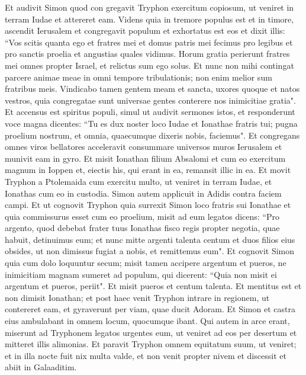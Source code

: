 \begin{biblechapter}  
\verse Et audivit Simon quod con gregavit Tryphon exercitum copiosum, ut veniret in terram Iudae et attereret eam. 
\verse Videns quia in tremore populus est et in timore, ascendit Ierusalem et congregavit populum 
\verse et exhortatus est eos et dixit illis: “Vos scitis quanta ego et fratres mei et domus patris mei fecimus pro legibus et pro sanctis proelia et angustias quales vidimus. 
\verse Horum gratia perierunt fratres mei omnes propter Israel, et relictus sum ego solus.  
\verse Et nunc non mihi contingat parcere animae meae in omni tempore tribulationis; non enim melior sum fratribus meis. 
\verse Vindicabo tamen gentem meam et sancta, uxores quoque et natos vestros, quia congregatae sunt universae gentes conterere nos inimicitiae gratia". 
\verse Et accensus est spiritus populi, simul ut audivit sermones istos, 
\verse et responderunt voce magna dicentes: “Tu es dux noster loco Iudae et Ionathae fratris tui; 
\verse pugna proelium nostrum, et omnia, quaecumque dixeris nobis, faciemus". 
\verse Et congregans omnes viros bellatores acceleravit consummare universos muros Ierusalem et munivit eam in gyro. 
\verse Et misit Ionathan filium Absalomi et cum eo exercitum magnum in Ioppen et, eiectis his, qui erant in ea, remansit illic in ea. 
\verse Et movit Tryphon a Ptolemaida cum exercitu multo, ut veniret in terram Iudae, et Ionathas cum eo in custodia. 
\verse Simon autem applicuit in Adidis contra faciem campi. 
\verse Et ut cognovit Tryphon quia surrexit Simon loco fratris sui Ionathae et quia commissurus esset cum eo proelium, misit ad eum legatos 
\verse dicens: “Pro argento, quod debebat frater tuus Ionathas fisco regis propter negotia, quae habuit, detinuimus eum; 
\verse et nunc mitte argenti talenta centum et duos filios eius obsides, ut non dimissus fugiat a nobis, et remittemus eum". 
\verse Et cognovit Simon quia cum dolo loquuntur secum; misit tamen accipere argentum et pueros, ne inimicitiam magnam sumeret ad populum,  
\verse qui dicerent: “Quia non misit ei argentum et pueros, periit". 
\verse Et misit pueros et centum talenta. Et mentitus est et non dimisit Ionathan; 
\verse et post haec venit Tryphon intrare in regionem, ut contereret eam, et gyraverunt per viam, quae ducit Adoram. Et Simon et castra eius ambulabant in omnem locum, quocumque ibant. 
\verse Qui autem in arce erant, miserunt ad Tryphonem legatos urgentes eum, ut veniret ad eos per desertum et mitteret illis alimonias. 
\verse Et paravit Tryphon omnem equitatum suum, ut veniret; et in illa nocte fuit nix multa valde, et non venit propter nivem et discessit et abiit in Galaaditim. 

\end{biblechapter}
